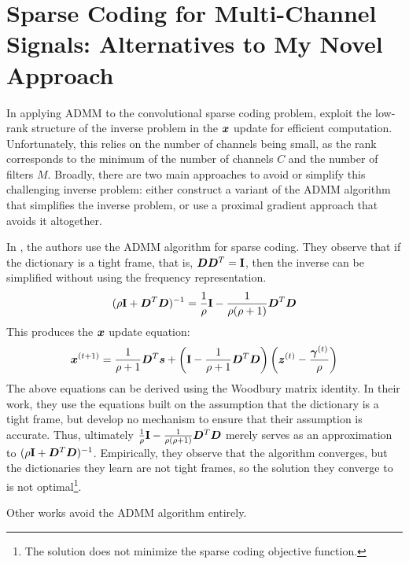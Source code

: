 \section{Sparse Coding for Multi-Channel Signals: Alternatives to My Novel Approach}
In applying ADMM to the convolutional sparse coding problem, \cite{vsorel2016fast} \cite{heide2015fast} \cite{wohlberg2015efficient} exploit the low-rank structure of the inverse problem in the $\bm{x}$ update for efficient computation. Unfortunately, this relies on the number of channels being small, as the rank corresponds to the minimum of the number of channels $C$ and the number of filters $M$. Broadly, there are two main approaches to avoid or simplify this challenging inverse problem: either construct a variant of the ADMM algorithm that simplifies the inverse problem, or use a proximal gradient approach that avoids it altogether.

In \cite{chodosh2018deep}\cite{murdock2018deep}, the authors use the ADMM algorithm for sparse coding. They observe that if the dictionary is a tight frame, that is, $\bm{D}\bm{D}^T = {\bf I}$, then the inverse can be simplified without using the frequency representation.
%
\begin{equation}
(\rho{\bf I} + \bm{D}^T\bm{D})^{-1} = \frac{1}{\rho}{\bf I} - \frac{1}{\rho(\rho + 1)}\bm{D}^T\bm{D}
\end{equation}
%
This produces the $\bm{x}$ update equation:
%
\begin{equation}
\bm{x}^{(t + 1)} = \frac{1}{\rho + 1}\bm{D}^T\bm{s} + \left({\bf I} - \frac{1}{\rho + 1}\bm{D}^T\bm{D}\right)\left(\bm{z}^{(t)} - \frac{\bm{\gamma}^{(t)}}{\rho}\right)
\end{equation}
%
The above equations can be derived using the Woodbury matrix identity. In their work, they use the equations built on the assumption that the dictionary is a tight frame, but develop no mechanism to ensure that their assumption is accurate. Thus, ultimately $\frac{1}{\rho}{\bf I} - \frac{1}{\rho(\rho + 1)}\bm{D}^T\bm{D}$ merely serves as an approximation to $(\rho{\bf I} + \bm{D}^T\bm{D})^{-1}$. Empirically, they observe that the algorithm converges, but the dictionaries they learn are not tight frames, so the solution they converge to is not optimal\footnote{The solution does not minimize the sparse coding objective function.}.

Other works avoid the ADMM algorithm entirely.

